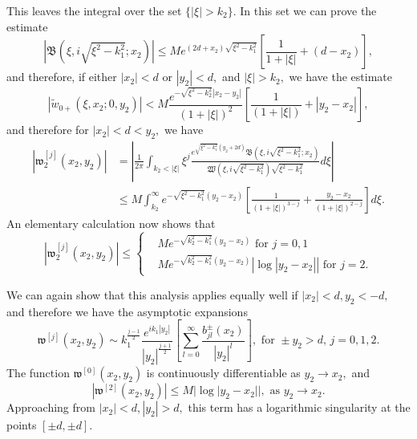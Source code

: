 \documentclass[11pt]{article}
\newcommand\fw{\mathfrak w}
\newcommand\fW{\mathfrak W}
\newcommand\fB{\mathfrak B}
\newcommand\tw{\tilde w_{0+}}
\theoremstyle{definition}
\theoremstyle{remark}
\begin{document}
   This leaves the integral over the set $\{|\xi|>k_2\}.$ In this set
   we can prove the estimate
   \begin{equation}
     \left|\fB(\xi,i\sqrt{\xi^2-k_1^2};x_2)\right|\leq
     Me^{(2d+x_2)\sqrt{\xi^2-k_1^2}}\left[\frac{1}{1+|\xi|}+(d-x_2)\right],
   \end{equation}
   and therefore, if either $|x_2|<d$ or $|y_2|<d,$ and $|\xi|>k_2,$ we have the estimate
   \begin{equation}\label{eqn92.9}
     |\tw(\xi,x_2;0,y_2)|<M\frac{e^{-\sqrt{\xi^2-k_2^2}|x_2-y_2|}}{(1+|\xi|)^2}\left[\frac{1}{(1+|\xi|)}+|y_2-x_2|\right],
   \end{equation}
   and therefore for $|x_2|<d<y_2,$ we have
   \begin{equation}
     \begin{split}
       |\fw^{[j]}_2(x_2,y_2)|&=
      \left|\frac{1}{2\pi}\int_{k_2<|\xi|}\xi^j\frac{e^{\sqrt{\xi^2-k_1^2}(y_2+2d)}
        \fB(\xi,i\sqrt{\xi^2-k_1^2};x_2)}
                  {\fW(\xi,i\sqrt{\xi^2-k_1^2})\sqrt{\xi^2-k_1^2}}d\xi\right|\\
     &\leq
                  M\int_{k_2}^{\infty}e^{-\sqrt{\xi^2-k_1^2}(y_2-x_2)}
                      \left[\frac{1}{(1+|\xi|)^{3-j}}+\frac{y_2-x_2}{(1+|\xi|)^{2-j}}\right]d\xi.
     \end{split}
   \end{equation}
   An elementary calculation now shows that
   \begin{equation}
     |\fw^{[j]}_2(x_2,y_2)|\leq \begin{cases}
       &Me^{-\sqrt{k_2^2-k_1^2}(y_2-x_2)}\text{ for }j=0,1\\
       &Me^{-\sqrt{k_2^2-k_1^2}(y_2-x_2)}\left|\log|y_2-x_2|\right|\text{ for }j=2.
       \end{cases}
   \end{equation}
   
   We can again show that this analysis applies equally well
   if $|x_2|<d,y_2<-d,$ and therefore we have the asymptotic expansions
   \begin{equation}\label{eqn246.667}
     \fw^{[j]}(x_2,y_2)\sim
  k_1^{\frac{j-1}{2}}\frac{e^{ik_1|y_2|}}
      {|y_2|^{\frac{j+1}{2}}}\left[\sum_{l=0}^{\infty}\frac{b^{\pm}_{jl}(x_2)}{|y_2|^l}\right],
       \text{ for }\pm y_2>d,\,j=0,1,2.
  \end{equation}
    The function $\fw^{[0]}(x_2,y_2)$ is continuously differentiable as
    $y_2\to x_2,$ and
   \begin{equation}
     |\fw^{[2]}(x_2,y_2)|\leq M|\log|y_2-x_2||,\text{ as }y_2\to x_2.
   \end{equation}
   Approaching from $|x_2|<d, |y_2|>d,$  this term has a logarithmic singularity at
   the points $[\pm d,\pm d].$
   
\end{document}
